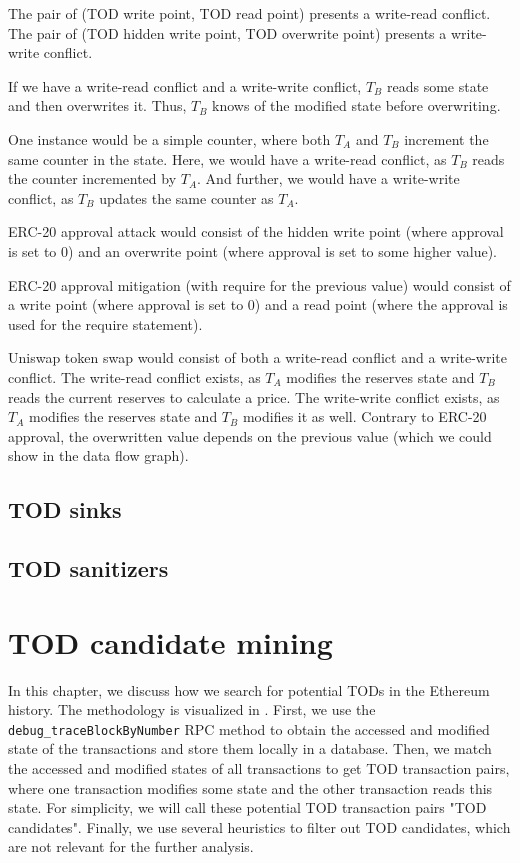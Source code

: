 \documentclass[draft,final]{vutinfth} %
\begin{document}
The pair of (TOD write point, TOD read point) presents a write-read conflict. The pair of (TOD hidden write point, TOD overwrite point) presents a write-write conflict.

If we have a write-read conflict and a write-write conflict, $T_B$ reads some state and then overwrites it. Thus, $T_B$ knows of the modified state before overwriting.

One instance would be a simple counter, where both $T_A$ and $T_B$ increment the same counter in the state. Here, we would have a write-read conflict, as $T_B$ reads the counter incremented by $T_A$. And further, we would have a write-write conflict, as $T_B$ updates the same counter as $T_A$.

ERC-20 approval attack would consist of the hidden write point (where approval is set to 0) and an overwrite point (where approval is set to some higher value).

ERC-20 approval mitigation (with require for the previous value) would consist of a write point (where approval is set to 0) and a read point (where the approval is used for the require statement).

Uniswap token swap would consist of both a write-read conflict and a write-write conflict. The write-read conflict exists, as $T_A$ modifies the reserves state and $T_B$ reads the current reserves to calculate a price. The write-write conflict exists, as $T_A$ modifies the reserves state and $T_B$ modifies it as well. Contrary to ERC-20 approval, the overwritten value depends on the previous value (which we could show in the data flow graph).

\section{TOD sinks}

\section{TOD sanitizers}

\chapter{TOD candidate mining}

In this chapter, we discuss how we search for potential TODs in the Ethereum history. The methodology is visualized in . First, we use the \verb|debug_traceBlockByNumber| RPC method to obtain the accessed and modified state of the transactions and store them locally in a database. Then, we match the accessed and modified states of all transactions to get TOD transaction pairs, where one transaction modifies some state and the other transaction reads this state. For simplicity, we will call these potential TOD transaction pairs "TOD candidates". Finally, we use several heuristics to filter out TOD candidates, which are not relevant for the further analysis.
\end{document}
